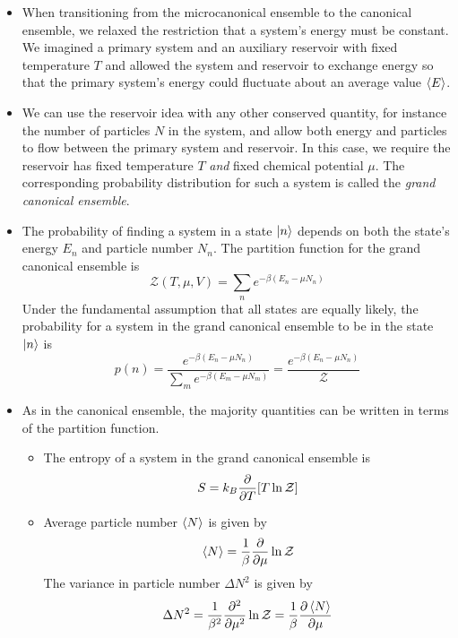 \documentclass[11pt, a4paper]{article}
\begin{document}
\begin{itemize}
	\item When transitioning from the microcanonical ensemble to the canonical ensemble, we relaxed the restriction that a system's energy must be constant. We imagined a primary system and an auxiliary reservoir with fixed temperature $ T $ and allowed the system and reservoir to exchange energy so that the primary system's energy could fluctuate about an average value $ \expval{E} $.
	
	\item We can use the reservoir idea with any other conserved quantity, for instance the number of particles $ N $ in the system, and allow both energy and particles to flow between the primary system and reservoir. In this case, we require the reservoir has fixed temperature $ T $ \textit{and} fixed chemical potential $ \mu $. The corresponding probability distribution for such a system is called the \textit{grand canonical ensemble}.
	
	\item The probability of finding a system in a state $ \ket{n} $ depends on both the state's energy $ E_{n} $ and particle number $ N_{n} $. The partition function for the grand canonical ensemble is
	\begin{equation*}
		\mathcal{Z}(T, \mu, V) = \sum_{n}e^{-\beta(E_{n} - \mu N_{n})}
	\end{equation*}
	Under the fundamental assumption that all states are equally likely, the probability for a system in the grand canonical ensemble to be in the state $ \ket{n} $ is
	\begin{equation*}
		p(n) = \frac{e^{-\beta(E_{n} - \mu N_{n})}}{\sum_{m}e^{-\beta(E_{m} - \mu N_{m})}} = \frac{e^{-\beta(E_{n} - \mu N_{n})}}{\mathcal{Z}}
	\end{equation*}
	
	\item As in the canonical ensemble, the majority quantities can be written in terms of the partition function. 
	
	\begin{itemize}
		\item The entropy of a system in the grand canonical ensemble is
		\begin{equation*}
			S = k_{B}\pdv{}{T}[T \ln \mathcal{Z}]
		\end{equation*}
		
		\item Average particle number $ \expval{N} $ is given by
		\begin{equation*}
			\expval{N} = \frac{1}{\beta} \pdv{}{\mu}\ln \mathcal{Z}
		\end{equation*}
		The variance in particle number $ \Delta N^{2} $ is given by
		\begin{equation*}
			\Delta N^{2} = \frac{1}{\beta^{2}}\pdv[2]{}{\mu} \ln \mathcal{Z} = \frac{1}{\beta}\pdv{\expval{N}}{\mu}
		\end{equation*}
		

\end{itemize}
\end{itemize}
\end{document}
